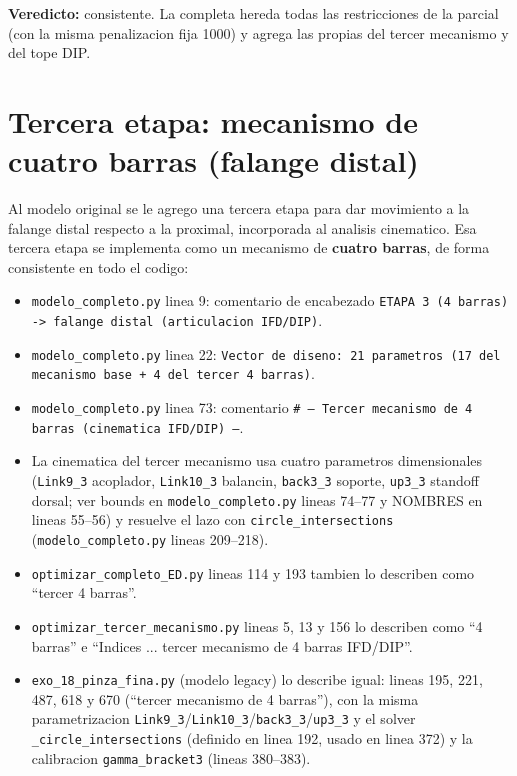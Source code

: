 \documentclass[11pt,a4paper]{article}
\newcommand{\code}[1]{\texttt{#1}}
\begin{document}
\textbf{Veredicto:} consistente. La completa hereda todas las restricciones de la
parcial (con la misma penalizacion fija 1000) y agrega las propias del tercer
mecanismo y del tope DIP.

\section{Tercera etapa: mecanismo de cuatro barras (falange distal)}

Al modelo original se le agrego una tercera etapa para dar movimiento a la
falange distal respecto a la proximal, incorporada al analisis cinematico. Esa
tercera etapa se implementa como un mecanismo de \textbf{cuatro barras}, de forma
consistente en todo el codigo:

\begin{itemize}[leftmargin=1.4em]
  \item \code{modelo\_completo.py} linea 9: comentario de encabezado
        \code{ETAPA 3 (4 barras) -> falange distal (articulacion IFD/DIP)}.
  \item \code{modelo\_completo.py} linea 22: \code{Vector de diseno: 21
        parametros (17 del mecanismo base + 4 del tercer 4 barras)}.
  \item \code{modelo\_completo.py} linea 73: comentario \code{\# --- Tercer
        mecanismo de 4 barras (cinematica IFD/DIP) ---}.
  \item La cinematica del tercer mecanismo usa cuatro parametros dimensionales
        (\code{Link9\_3} acoplador, \code{Link10\_3} balancin, \code{back3\_3}
        soporte, \code{up3\_3} standoff dorsal; ver bounds en
        \code{modelo\_completo.py} lineas 74--77 y NOMBRES en lineas 55--56) y
        resuelve el lazo con \code{circle\_intersections}
        (\code{modelo\_completo.py} lineas 209--218).
  \item \code{optimizar\_completo\_ED.py} lineas 114 y 193 tambien lo describen
        como ``tercer 4 barras''.
  \item \code{optimizar\_tercer\_mecanismo.py} lineas 5, 13 y 156 lo describen
        como ``4 barras'' e ``Indices ... tercer mecanismo de 4 barras IFD/DIP''.
  \item \code{exo\_18\_pinza\_fina.py} (modelo legacy) lo describe igual:
        lineas 195, 221, 487, 618 y 670 (``tercer mecanismo de 4 barras''), con
        la misma parametrizacion
        \code{Link9\_3}/\code{Link10\_3}/\code{back3\_3}/\code{up3\_3} y el solver
        \code{\_circle\_intersections} (definido en linea 192, usado en linea 372)
        y la calibracion \code{gamma\_bracket3} (lineas 380--383).
\end{itemize}
\end{document}
